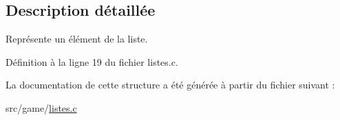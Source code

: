 \subsection{Description détaillée}
Représente un élément de la liste. 

Définition à la ligne 19 du fichier listes.\+c.



La documentation de cette structure a été générée à partir du fichier suivant \+:\begin{DoxyCompactItemize}
\item 
src/game/\hyperlink{listes_8c}{listes.\+c}\end{DoxyCompactItemize}
